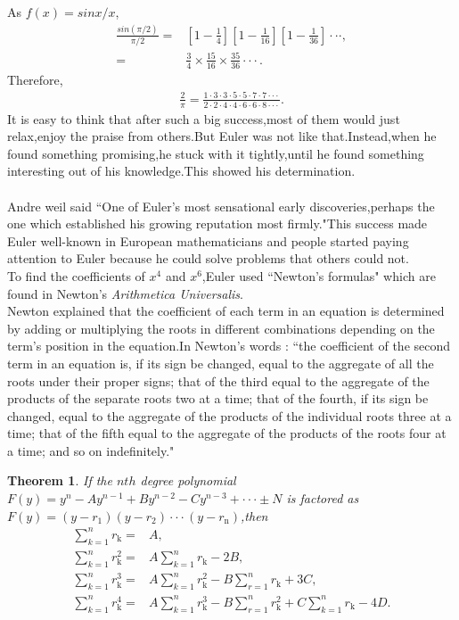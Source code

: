 \documentclass[a4paper,reqno,11pt]{book}
\theoremstyle{plain}%
\newtheorem{thm}{Theorem}[chapter]
\theoremstyle{definition}
\begin{document}
As $f(x)=sinx/x$,
\begin{align*}
    \frac{sin(\pi/2)}{\pi/2}=&\left[1-\frac{1}{4}\right]\left[1-\frac{1}{16}\right]\left[1-\frac{1}{36}\right]\cdot\cdot\cdot,\\
    =&\frac{3}{4}\times\frac{15}{16}\times\frac{35}{36}\cdot\cdot\cdot.
\end{align*}
Therefore,
\begin{eqnarray*}
    \frac{2}{\pi}=\frac{1\cdot3\cdot3\cdot5\cdot5\cdot7\cdot7\cdot\cdot\cdot}{2\cdot2\cdot4\cdot4\cdot6\cdot6\cdot8\cdot\cdot\cdot}.
\end{eqnarray*}
It is easy to think that after such a big success,most of them would just relax,enjoy the praise from others.But Euler was not like that.Instead,when he found something promising,he stuck with it tightly,until he found something interesting out of his knowledge.This showed his determination.\\
\\
Andre weil said ``One of Euler's most sensational early discoveries,perhaps the one which established his growing reputation most firmly."This success made Euler well-known in European mathematicians and people started paying attention to Euler because he could solve problems that others could not.\\
To find the coefficients of $x^4$ and $x^6$,Euler used ``Newton's formulas" which are found in Newton's \textit{Arithmetica Universalis}.\\
Newton explained that the coefficient of each term in an equation  is determined by adding or multiplying the roots in different combinations depending on the term's position in the equation.In Newton's words : 
``the coefficient of the second term in an equation is, if its sign be changed, equal to the aggregate of all the roots under their proper signs; that of the third equal to the aggregate of the products of the separate roots two at a time; that of the fourth, if its sign be changed, equal to the aggregate of the products of the individual roots three at a time; that of the fifth equal to the aggregate of the products of the roots four at a time; and so on indefinitely."\cite{ref9}
\begin{thm}\label{thm:Type 2}
If the $nth$ degree polynomial $F(y)=y^n-Ay^{n-1}+By^{n-2}-Cy^{n-3}+\cdot\cdot\cdot \pm N$ is factored as $F(y)=(y-r_{\text{1}})(y-r_{\text{2}})\cdot\cdot\cdot(y-r_{\text{n}})$,then
\begin{align*}
    \sum_{k=1}^{n}r_{\text{k}}=&A,\\
    \sum_{k=1}^{n}r_{\text{k}}^2=&A\sum_{k=1}^{n}r_{\text{k}}-2B,\\
    \sum_{k=1}^{n}r_{\text{k}}^3=&A\sum_{k=1}^{n}r_{\text{k}}^2-B\sum_{r=1}^{n}r_{\text{k}}+3C,\\
     \sum_{k=1}^{n}r_{\text{k}}^4=&A\sum_{k=1}^{n}r_{\text{k}}^3-B\sum_{r=1}^{n}r_{\text{k}}^2+C\sum_{k=1}^{n}r_{\text{k}}-4D.
\end{align*}
\end{thm}
\end{document}
